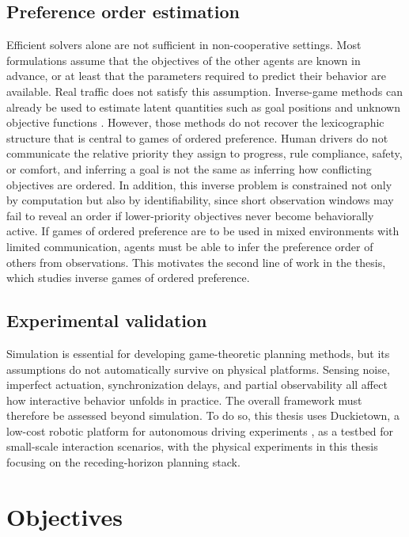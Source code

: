 \subsection{Preference order estimation}

Efficient solvers alone are not sufficient in non-cooperative settings.
Most formulations assume that the objectives of the other agents are known
in advance, or at least that the parameters required to predict their
behavior are available. Real traffic does not satisfy this assumption.
Inverse-game methods can already be used to estimate latent quantities
such as goal positions and unknown objective functions
\cite{liu:2023,li:2023,liu:2024}. However, those methods do not recover
the lexicographic structure that is central to games of ordered
preference. Human drivers do not communicate the relative priority they
assign to progress, rule compliance, safety, or comfort, and inferring a
goal is not the same as inferring how conflicting objectives are ordered.
In addition, this inverse problem is constrained not only by computation
but also by identifiability, since short observation windows may fail to reveal
an order if lower-priority objectives never become behaviorally active.
If games of ordered preference are to be used in mixed environments with
limited communication, agents must be able to infer the preference order
of others from observations. This motivates the second line of work in
the thesis, which studies inverse games of ordered preference.

\subsection{Experimental validation}

Simulation is essential for developing game-theoretic planning methods,
but its assumptions do not automatically survive on physical platforms.
Sensing noise, imperfect actuation, synchronization delays, and partial
observability all affect how interactive behavior unfolds in practice.
The overall framework must therefore be assessed beyond simulation.
To do so, this thesis uses Duckietown, a low-cost robotic platform for autonomous driving
experiments \cite{duckietown:2017}, as a testbed for small-scale
interaction scenarios, with the physical experiments in this thesis
focusing on the receding-horizon planning stack.

\section{Objectives}

